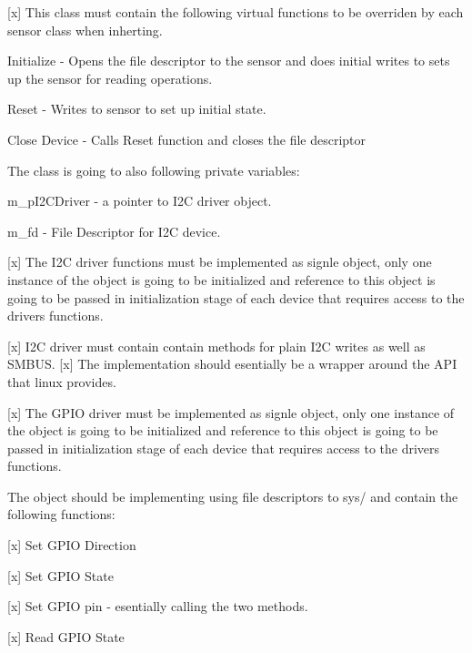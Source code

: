 \mbox{[}x\mbox{]} This class must contain the following virtual functions to be overriden by each sensor class when inherting.
\begin{DoxyItemize}
\item Initialize -\/ Opens the file descriptor to the sensor and does initial writes to sets up the sensor for reading operations.
\item Reset -\/ Writes to sensor to set up initial state.
\item Close Device -\/ Calls Reset function and closes the file descriptor
\end{DoxyItemize}

The class is going to also following private variables\+:
\begin{DoxyItemize}
\item m\+\_\+p\+I2\+C\+Driver -\/ a pointer to I2C driver object.
\item m\+\_\+fd -\/ File Descriptor for I2C device.
\end{DoxyItemize}

\mbox{[}x\mbox{]} The I2C driver functions must be implemented as signle object, only one instance of the object is going to be initialized and reference to this object is going to be passed in initialization stage of each device that requires access to the driver\textquotesingle{}s functions.

\mbox{[}x\mbox{]} I2C driver must contain contain methods for plain I2C writes as well as S\+M\+B\+US. \mbox{[}x\mbox{]} The implementation should esentially be a wrapper around the A\+PI that linux provides.

\mbox{[}x\mbox{]} The G\+P\+IO driver must be implemented as signle object, only one instance of the object is going to be initialized and reference to this object is going to be passed in initialization stage of each device that requires access to the driver\textquotesingle{}s functions.

The object should be implementing using file descriptors to sys/ and contain the following functions\+:
\begin{DoxyItemize}
\item \mbox{[}x\mbox{]} Set G\+P\+IO Direction
\item \mbox{[}x\mbox{]} Set G\+P\+IO State
\item \mbox{[}x\mbox{]} Set G\+P\+IO pin -\/ esentially calling the two methods.
\item \mbox{[}x\mbox{]} Read G\+P\+IO State
\end{DoxyItemize}

